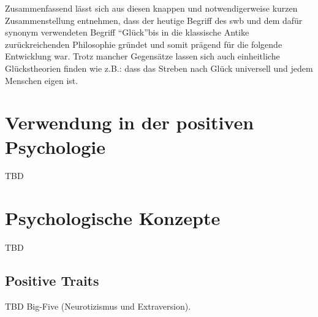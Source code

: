 Zusammenfassend lässt sich aus diesen knappen und notwendigerweise kurzen Zusammenstellung entnehmen, dass der heutige Begriff des \gls{swb} und dem dafür synonym verwendeten Begriff \textquotedblleft Glück\textquotedblright  bis in die klassische Antike zurückreichenden Philosophie gründet und somit prägend für die folgende Entwicklung war. Trotz mancher Gegensätze lassen sich auch einheitliche Glückstheorien finden wie z.B.: dass das Streben nach Glück universell und jedem Menschen eigen ist. 
  
\section{Verwendung in der positiven Psychologie}\label{pospsy}
TBD

\section{Psychologische Konzepte}\label{konzept}
TBD

\subsection{Positive Traits}\label{traits}
TBD Big-Five (Neurotizismus und Extraversion).



